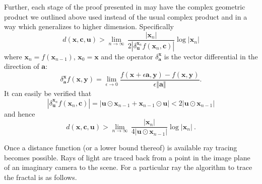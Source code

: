\documentclass{elsart}
\theoremstyle{definition}
\newcommand{\magof}[1]{\left\Vert #1 \right\Vert}
\newcommand{\complexprod}{\odot}
\begin{document}
Further, each stage of the proof presented in
\cite{FRAC:HypercomplexIterations} may have the complex geometric product we
outlined above used instead of the usual complex product and in a way which
generalizes to higher dimension. Specifically
\begin{equation}
d(\mathbf{x}, \mathbf{c}, \mathbf{u}) > 
   \lim_{n \rightarrow \infty}\,\frac{|\mathbf{x}_n|}{2|\delta^{\mathbf{x}_{n}}_\mathbf{u}
f(\mathbf{x}_{n}, \mathbf{c})|}\log|\mathbf{x}_n|
\end{equation}
where $\mathbf{x}_n = f(\mathbf{x}_{n-1})$, $\mathbf{x}_0 = \mathbf{x}$ and the operator 
$\delta^\mathbf{x}_\mathbf{a}$ is the vector differential in the direction of
$\mathbf{a}$:
\begin{equation}
\delta^{\mathbf{x}}_\mathbf{a} f(\mathbf{x}, \mathbf{y}) =
\lim_{\epsilon \rightarrow 0} 
\frac{f(\mathbf{x} + \epsilon \mathbf{a}, \mathbf{y}) - f(\mathbf{x}, \mathbf{y})}
{\epsilon \magof{\mathbf{a}}}.
\end{equation}
It can easily be verified that
\begin{equation}
|\delta^{\mathbf{x}_{n}}_\mathbf{u} f(\mathbf{x}_{n}, \mathbf{c})|
 = |\mathbf{u} \complexprod \mathbf{x}_{n-1} + \mathbf{x}_{n-1} \complexprod \mathbf{u}|
 < 2 |\mathbf{u} \complexprod \mathbf{x}_{n-1}|
\end{equation}
and hence
\begin{equation}
d(\mathbf{x}, \mathbf{c}, \mathbf{u}) > 
   \lim_{n \rightarrow \infty}\,\frac{|\mathbf{x}_n|}{4|
   \mathbf{u} \complexprod \mathbf{x}_{n-1}
   |}\log|\mathbf{x}_n|\ .
   \label{eqn:dist-low-bound}
\end{equation}

Once a distance function (or a lower bound thereof) is available ray tracing
becomes possible. Rays of light are traced back from a point in the image
plane of an imaginary camera to the scene. For a particular ray the algorithm
to trace the fractal is as follows.
\end{document}
